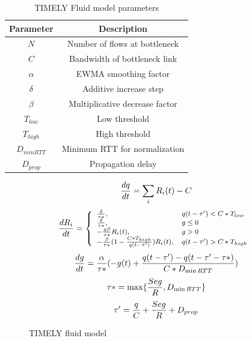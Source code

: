 \begin{table}[t]
\center
{
\footnotesize
{
\begin{tabular}{|c|c|} \hline
Parameter & Description \\ \hline
$N$ & Number of flows at bottleneck\\ \hline
$C$ & Bandwidth of bottleneck link\\ \hline
$\alpha$ & EWMA smoothing factor\\ \hline
$\delta$ & Additive increase step\\ \hline
$\beta$ & Multiplicative decrease factor\\ \hline
$T_{low}$ & Low threshold\\ \hline
$T_{high}$ & High threshold\\ \hline
$D_{minRTT}$ & Minimum RTT for normalization \\ \hline
$D_{prop}$ & Propagation delay \\ \hline
\end{tabular}
}
}
\caption{TIMELY Fluid model parameters}
\label{tab:timely_param}
\end{table}

\begin{figure}[h]
\fbox
{
\begin{minipage}{\columnwidth}
\begin{equation}
\small
\frac{{dq}}{{dt}} = \sum_{i} R_i(t) - C\\
\label{eq:timely_q}
\end{equation}
\begin{equation}
\small
\frac{{dR_i}}{{dt}} = \left\{ \begin{array}{ll}
\frac{\delta }{{\tau *}}, & q(t - \tau ') < C*{T_{low}}\\
\frac{\delta }{{\tau *}}, & g \le 0\\
 - \frac{{g\beta }}{{\tau *}}R_i(t), & g > 0\\
 - \frac{\beta }{{\tau *}}(1 - \frac{{C*{T_{high}}}}{{q(t - \tau ')}})R_i(t), & q(t - \tau ') > C*{T_{high}}
\end{array} \right.\\
\label{eq:timely_r}
\end{equation}
\begin{equation}
\small
\frac{{dg}}{{dt}} = \frac{\alpha }{{\tau *}}( - g(t) + \frac{{q(t - \tau ') - q(t - \tau ' - \tau *)}}{{C*{D_{\min RTT}}}})\\
\label{eq:timely_g}
\end{equation}
\begin{equation}
\small
\tau * = \max \{ \frac{{Seg}}{R},{D_{\min RTT}}\} \\
\label{eq:timely_taus}
\end{equation}
\begin{equation}
\small
\tau ' = \frac{q}{C} + \frac{{Seg}}{R} + {D_{prop}}
\label{eq:timely_taup}
\end{equation}
\end{minipage}
}
\caption{TIMELY fluid model}
\label{fig:timely_model}
\end{figure}

